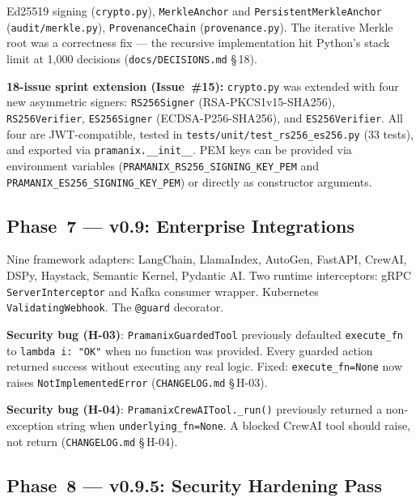 \documentclass[12pt,a4paper,oneside]{report}
\newcommand{\fname}[1]{\texttt{#1}}          %
\newcommand{\code}[1]{\texttt{#1}}           %
\newcommand{\cfrsec}[1]{\S\,#1}             %
\begin{document}
Ed25519 signing (\fname{crypto.py}), \code{MerkleAnchor} and
\code{PersistentMerkleAnchor} (\fname{audit/merkle.py}),
\code{ProvenanceChain} (\fname{provenance.py}). The iterative Merkle root was
a correctness fix --- the recursive implementation hit Python's stack limit at
1,000 decisions (\fname{docs/DECISIONS.md} \cfrsec{18}).

\textbf{18-issue sprint extension (Issue~\#15):} \fname{crypto.py} was
extended with four new asymmetric signers: \code{RS256Signer}
(RSA-PKCS1v15-SHA256), \code{RS256Verifier}, \code{ES256Signer}
(ECDSA-P256-SHA256), and \code{ES256Verifier}.  All four are JWT-compatible,
tested in \fname{tests/unit/test\_rs256\_es256.py} (33 tests), and exported
via \code{pramanix.\_\_init\_\_}.  PEM keys can be provided via environment
variables (\code{PRAMANIX\_RS256\_SIGNING\_KEY\_PEM} and
\code{PRAMANIX\_ES256\_SIGNING\_KEY\_PEM}) or directly as constructor
arguments.

\subsection{Phase~7 --- v0.9: Enterprise Integrations}

Nine framework adapters: LangChain, LlamaIndex, AutoGen, FastAPI, CrewAI,
DSPy, Haystack, Semantic Kernel, Pydantic AI. Two runtime interceptors: gRPC
\code{ServerInterceptor} and Kafka consumer wrapper. Kubernetes
\code{ValidatingWebhook}. The \code{@guard} decorator.

\textbf{Security bug (H-03)}: \code{PramanixGuardedTool} previously defaulted
\code{execute\_fn} to \code{lambda i: "OK"} when no function was provided.
Every guarded action returned success without executing any real logic. Fixed:
\code{execute\_fn=None} now raises \code{NotImplementedError}
(\fname{CHANGELOG.md} \cfrsec{H-03}).

\textbf{Security bug (H-04)}: \code{PramanixCrewAITool.\_run()} previously
returned a non-exception string when \code{underlying\_fn=None}. A blocked
CrewAI tool should raise, not return (\fname{CHANGELOG.md} \cfrsec{H-04}).

\subsection{Phase~8 --- v0.9.5: Security Hardening Pass}
\end{document}
